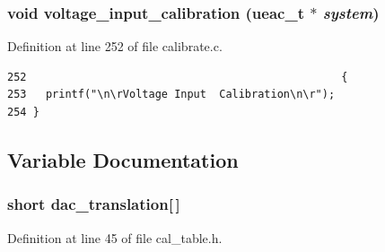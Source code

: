 \subsubsection{\setlength{\rightskip}{0pt plus 5cm}void voltage\_\-input\_\-calibration ({\bf ueac\_\-t} $\ast$ {\em system})}\label{calibrate_8c_a5}




Definition at line 252 of file calibrate.c.

\footnotesize\begin{verbatim}252                                                 {
253   printf("\n\rVoltage Input  Calibration\n\r");
254 }
\end{verbatim}\normalsize 




\subsection{Variable Documentation}
\subsubsection{\setlength{\rightskip}{0pt plus 5cm}short {\bf dac\_\-translation}[$\,$]}\label{calibrate_8c_a1}




Definition at line 45 of file cal\_\-table.h.